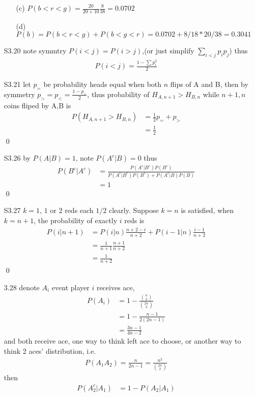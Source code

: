 \documentclass[paper=a4, fontsize=11pt]{scrartcl} %
\numberwithin{equation}{section} %
\numberwithin{figure}{section} %
\numberwithin{table}{section} %
\begin{document}
\begin{itemize}
\begin{itemize}
		\item[(c)] $P(b<r<g)=\frac{20}{20+10}\frac{8}{38} = 0.0702$
		\item[(d)] $P(b) = P(b<r<g) + P(b<g<r) = 0.0702 + 8/18 *20/38=0.3041$
	\end{itemize}
	\item[S3.20] note symmtry $P(i<j) = P(i>j)$,(or just simplify $\sum_{i<j}p_ip_j$) thus
	\begin{align}
		P(i<j)=\frac{1 -\sum p_i^2}{2}
	\end{align}
	\item[S3.21] let $p_=$ be probability heads equal when both $n$ flips of A and B, then by symmetry $p_>= p_< = \frac{1-p_=}{2}$, thus probability of $H_{A,n+1}>H_{B,n}$ while $n+1,n$ coins fliped by A,B is
	\begin{align}
		P(H_{A,n+1}>H_{B,n}) &= \frac{1}{2}p_= + p_> \\
			&= \frac{1}{2}
	\end{align}\qed
	\item[S3.26] by $P(A|B)= 1$, note $P(A^c|B)=0$ thus
	\begin{align}
		P(B^c|A^c) &= \frac{P(A^c|B^c)P(B^c)} {P(A^c|B^c)P(B^c) + P(A^c|B)P(B)}\\
			&= 1
	\end{align}\qed
	\item[S3.27] $k=1$, $1$ or $2$ reds each $1/2$ clearly. Suppose $k=n$ is satisfied, when $k=n+1$, the probability of exactly $i$ reds is
	\begin{align}
		P(i|n+1) &= P(i|n)\frac{n+2 - i}{n+2} + P(i-1|n)\frac{i-1}{n+2}\\
			&=\frac{1}{n+1} \frac{n+1}{n+2}\\
			&=\frac{1}{n+2}
	\end{align}\qed
	\item[3.28] denote $A_i$ event player $i$ receives ace,
	\begin{align}
		P(A_i) &= 1-\frac{{n\choose 2}}{{2n\choose 2}}\\
			&= 1 - \frac{n-1}{2(2n-1)}\\
			&= \frac{3n-1}{4n-2}
	\end{align}
	and both receive ace, one way to think left ace to choose, or another way to think 2 aces' distribution, i.e.
	\begin{align}
		P(A_1A_2) = \frac{n}{2n-1} = \frac{n^2}{{2n\choose 2}}
	\end{align}
	then
	\begin{align}
		P(A_2^c|A_1) &= 1-P(A_2|A_1) \\

\end{align}
\end{itemize}
\end{document}
